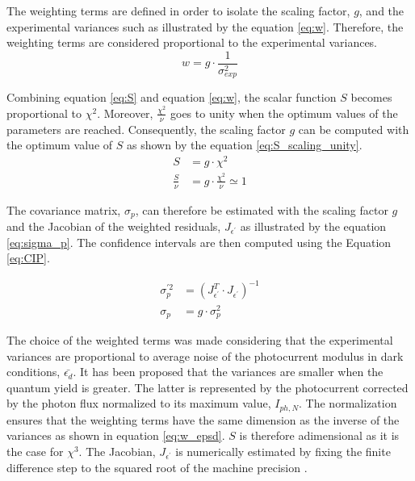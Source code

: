 \documentclass[10pt, 3p, sort&compress]{elsarticle}
\newcommand{\sigmae}{\sigma _{exp}}
\newcommand{\sigmap}{\sigma _{p}}
\newcommand{\epsp}{\epsilon ^{\prime}}
\newcommand{\jep}{J _{\epsp}}
\begin{document}
The weighting terms are defined in order to isolate the scaling factor, $g$, and the experimental variances such as illustrated by the equation \ref{eq:w}. Therefore, the weighting terms are considered proportional to the experimental variances.
\begin{equation}
	w=g \cdot \frac{1}{\sigmae ^2}
	\label{eq:w}
\end{equation}	
	
Combining equation \ref{eq:S} and equation \ref{eq:w}, the scalar function $S$ becomes proportional to $\chi ^2$. Moreover, $\frac{\chi ^2}{\nu}$ goes to unity when the optimum values of the parameters are reached. Consequently, the scaling factor $g$ can be computed with the optimum value of $S$ as shown by the equation \ref{eq:S_scaling_unity}.
\begin{equation}
\begin{split}
S &=g \cdot \chi ^2 \\
\frac{S}{\nu}&=g \cdot \frac{\chi ^2}{\nu} \simeq 1
\end{split}
\label{eq:S_scaling_unity}
\end{equation}
	

The covariance matrix, $\sigmap$, can therefore be estimated with the scaling factor $g$ and the Jacobian of the weighted residuals, $\jep$ as illustrated by the equation \ref{eq:sigma_p}. The confidence intervals are then computed using the Equation \ref{eq:CIP}.
	
\begin{equation}
\begin{split}
\sigmap ^{\prime 2} &= ( \jep ^T \cdot \jep ) ^{-1} \\
\sigmap &= g \cdot \sigmap ^2
\end{split}
\label{eq:sigma_p}
\end{equation}

The choice of the weighted terms was made considering that the experimental variances are proportional to average noise of the photocurrent modulus in dark conditions, $\bar{\epsilon _d}$. It has been proposed that the variances are smaller when the quantum yield is greater. The latter is represented by the photocurrent corrected by the photon flux normalized to its maximum value, $I_{ph,N}$. The normalization ensures that the weighting terms have the same dimension as the inverse of the variances as shown in equation \ref{eq:w_epsd}. $S$ is therefore adimensional as it is the case for $\chi ^3$. The Jacobian, $\jep$ is numerically estimated by fixing the finite difference step to the squared root of the machine precision \citep{nocedal2006, press2007}.
\end{document}
